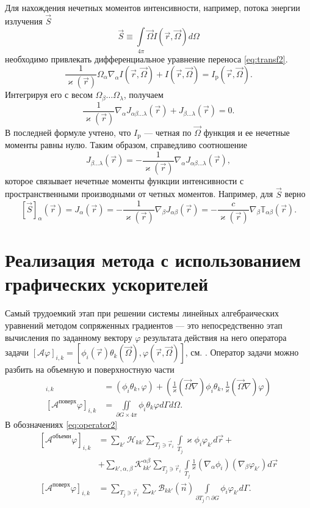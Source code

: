 Для нахождения нечетных моментов интенсивности, например, потока энергии излучения $\vec S$
\[
\vec S \equiv \int\limits_{4\pi} \vec \Omega I(\vec r, \vec \Omega) d\Omega
\]
необходимо привлекать дифференциальное уравнение переноса \eqref{eq:transf2}.
\[
\frac{1}{\varkappa(\vec r)} \Omega_\alpha \nabla_\alpha I(\vec r, \vec \Omega) + I(\vec r, \vec \Omega) = I_\text{p}(\vec r, \vec \Omega).
\]
Интегрируя его с весом $\Omega_\beta\dots\Omega_\lambda$, получаем
\[
\frac{1}{\varkappa(\vec r)} \nabla_\alpha J_{\alpha\beta\dots\lambda}(\vec r) + 
J_{\beta\dots\lambda}(\vec r) = 0.
\]
В последней формуле учтено, что $I_\text{p}$ --- четная по $\vec \Omega$ функция и ее нечетные моменты равны нулю. Таким образом, справедливо соотношение
\[
J_{\beta\dots\lambda}(\vec r) = -\frac{1}{\varkappa(\vec r)} \nabla_\alpha J_{\alpha\beta\dots\lambda}(\vec r),
\]
которое связывает нечетные моменты функции интенсивности с пространственными производными от четных моментов. Например, для $\vec S$ верно
\[
[\vec S]_\alpha(\vec r) = J_\alpha(\vec r) = -\frac{1}{\varkappa(\vec r)} \nabla_\beta J_{\alpha \beta}(\vec r) = -\frac{c}{\varkappa(\vec r)} \nabla_\beta \mathbb T_{\alpha\beta}(\vec r).
\]

\section{Реализация метода с использованием графических ускорителей}

Самый трудоемкий этап при решении системы линейных алгебраических уравнений методом сопряженных градиентов --- это непосредственно
этап вычисления по заданному вектору $\varphi$ результата действия на него оператора задачи
$[\mathcal{A}\varphi]_{i,k} = [\phi_i(\vec r)\theta_k(\vec \Omega), \varphi(\vec r, \vec \Omega)]$, см. \cite{miptconf53}. Оператор задачи можно разбить на 
объемную и поверхностную части
\begin{align*}
[\mathcal{A}^\text{объемн} \varphi]_{i,k} &= \left(\phi_i\theta_k, \varphi\right) + 
\left(\frac{1}{\varkappa}(\vec \Omega \nabla)\phi_i\theta_k, \frac{1}{\varkappa}(\vec \Omega \nabla)\varphi\right)\\
[\mathcal{A}^\text{поверх} \varphi]_{i,k} &= \iint\limits_{\partial G \times 4\pi} \phi_i\theta_k \varphi d\Gamma d\Omega.
\end{align*}
В обозначениях \eqref{eq:operator2}
\begin{align*}\nonumber
[\mathcal{A}^\text{объемн} \varphi]_{i,k}  &= \sum_{k'} \mathscr{H}_{kk'}\sum_{T_j \ni \vec r_i}\int\limits_{T_j} \varkappa \phi_i \varphi_{k'} d\vec r +\\
&+\sum_{k',\alpha,\beta} \mathscr{K}_{kk'}^{\alpha\beta}
\sum_{T_j \ni \vec r_i}\int\limits_{T_j} \frac{1}{\varkappa} (\nabla_\alpha\phi_i)(\nabla_\beta\varphi_{k'}) d\vec r\\
[\mathcal{A}^\text{поверх} \varphi]_{i,k} &= \sum_{T_j \ni \vec r_i}
\sum_{k'}\mathscr{B}_{kk'}(\vec n)
\int\limits_{\partial T_j \cap \partial G} 
\phi_i \varphi_{k'} d\Gamma.
\end{align*}

